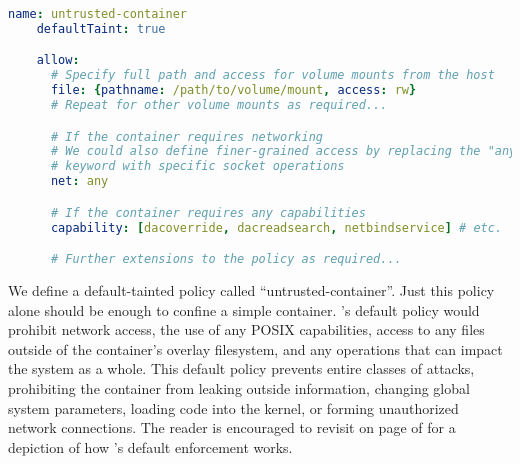 \begin{lstlisting}[language=yaml, gobble=4,
  caption={[Confining an untrusted container with \bpfcontain{}]
    Confining an untrusted container with \bpfcontain{}.
    Note that this policy requires some extensions on top of the existing \bpfcontain{}
    model, such as instrumenting the Docker container runtime.
    %\bpfcontain{}'s default
    %enforcement policy of defining a boundary around the container enables this policy to
    %be quite simple. A default-tainted policy enables container-level confinement without
    %specifying \textit{any} rules whatsoever. This policy can then be adjusted as
    %required, specifying file rules to provision access to volume mounts, network rules to
    %enable networking, and capability rules to enable access to specific POSIX
    %capabilities.
  },
  label={lst:bpfcontain-untrusted}, float=true]
    name: untrusted-container
    defaultTaint: true

    allow:
      # Specify full path and access for volume mounts from the host
      file: {pathname: /path/to/volume/mount, access: rw}
      # Repeat for other volume mounts as required...

      # If the container requires networking
      # We could also define finer-grained access by replacing the "any"
      # keyword with specific socket operations
      net: any

      # If the container requires any capabilities
      capability: [dacoverride, dacreadsearch, netbindservice] # etc.

      # Further extensions to the policy as required...
\end{lstlisting}

We define a default-tainted \bpfcontain{} policy called \enquote{untrusted-container}.
Just this policy alone should be enough to confine a simple container. \bpfcontain{}'s
default policy would prohibit network access, the use of any POSIX capabilities, access to
any files outside of the container's overlay filesystem, and any operations that can
impact the system as a whole. This default policy prevents entire classes of attacks,
prohibiting the container from leaking outside information, changing global system
parameters, loading code into the kernel, or forming unauthorized network connections. The
reader is encouraged to revisit  on page
\pageref{fig:bpfcontain-enforcement} of  for a depiction of how
\bpfcontain{}'s default enforcement works.

